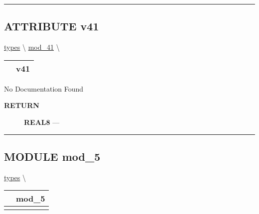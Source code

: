 \rule{\linewidth}{0.5pt}

\subsection*{\textsf{\colorbox{headtoc}{\color{white} ATTRIBUTE}
v41}}

\hypertarget{ecldoc:types.mod_41.v41}{}
\hspace{0pt} \hyperlink{ecldoc:types}{types} \textbackslash 
\hspace{0pt} \hyperlink{ecldoc:types.mod_41}{mod_41} \textbackslash 

{\renewcommand{\arraystretch}{1.5}
\begin{tabularx}{\textwidth}{|>{\raggedright\arraybackslash}l|X|}
\hline
\hspace{0pt}\mytexttt{\color{red} } & \textbf{v41} \\
\hline
\end{tabularx}
}

\par





No Documentation Found








\par
\begin{description}
\item [\colorbox{tagtype}{\color{white} \textbf{\textsf{RETURN}}}] \textbf{REAL8} --- 
\end{description}




\rule{\linewidth}{0.5pt}


\subsection*{\textsf{\colorbox{headtoc}{\color{white} MODULE}
mod\_5}}

\hypertarget{ecldoc:types.mod_5}{}
\hspace{0pt} \hyperlink{ecldoc:types}{types} \textbackslash 

{\renewcommand{\arraystretch}{1.5}
\begin{tabularx}{\textwidth}{|>{\raggedright\arraybackslash}l|X|}
\hline
\hspace{0pt}\mytexttt{\color{red} } & \textbf{mod\_5} \\
\hline
\multicolumn{2}{|>{\raggedright\arraybackslash}X|}{\hspace{0pt}\mytexttt{\color{param} (REAL8 x)}} \\
\hline
\end{tabularx}
}

